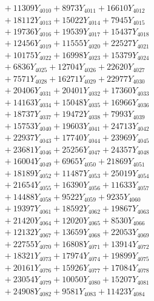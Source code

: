 \documentclass[a4paper,10pt]{article}
\begin{document}
{\begin{align}
&\;  + 11309 Y_{4010} + 8973 Y_{4011} + 16610 Y_{4012} \\[0.3ex]
&\;  + 18112 Y_{4013} + 15022 Y_{4014} + 7945 Y_{4015} \\[0.3ex]
&\;  + 19736 Y_{4016} + 19539 Y_{4017} + 15437 Y_{4018} \\[0.5ex]\allowbreak
&\;  + 12456 Y_{4019} + 11555 Y_{4020} + 22527 Y_{4021} \\[0.3ex]
&\;  + 10175 Y_{4022} + 16998 Y_{4023} + 15379 Y_{4024} \\[0.3ex]
&\;  + 6836 Y_{4025} + 12704 Y_{4026} + 22620 Y_{4027} \\[0.3ex]
&\;  + 7571 Y_{4028} + 16271 Y_{4029} + 22977 Y_{4030} \\[0.3ex]
&\;  + 20406 Y_{4031} + 20401 Y_{4032} + 17360 Y_{4033} \\[0.3ex]
&\;  + 14163 Y_{4034} + 15048 Y_{4035} + 16966 Y_{4036} \\[0.3ex]
&\;  + 18737 Y_{4037} + 19472 Y_{4038} + 7993 Y_{4039} \\[0.3ex]
&\;  + 15753 Y_{4040} + 19603 Y_{4041} + 24713 Y_{4042} \\[0.3ex]
&\;  + 22937 Y_{4043} + 17740 Y_{4044} + 23969 Y_{4045} \\[0.3ex]
&\;  + 23681 Y_{4046} + 25256 Y_{4047} + 24357 Y_{4048} \\[0.5ex]\allowbreak
&\;  + 16004 Y_{4049} + 6965 Y_{4050} + 21869 Y_{4051} \\[0.3ex]
&\;  + 18189 Y_{4052} + 11487 Y_{4053} + 25019 Y_{4054} \\[0.3ex]
&\;  + 21654 Y_{4055} + 16390 Y_{4056} + 11633 Y_{4057} \\[0.3ex]
&\;  + 14488 Y_{4058} + 9522 Y_{4059} + 9235 Y_{4060} \\[0.3ex]
&\;  + 19397 Y_{4061} + 18592 Y_{4062} + 19867 Y_{4063} \\[0.3ex]
&\;  + 21420 Y_{4064} + 12020 Y_{4065} + 8530 Y_{4066} \\[0.3ex]
&\;  + 12132 Y_{4067} + 13659 Y_{4068} + 22053 Y_{4069} \\[0.3ex]
&\;  + 22755 Y_{4070} + 16808 Y_{4071} + 13914 Y_{4072} \\[0.3ex]
&\;  + 18321 Y_{4073} + 17974 Y_{4074} + 19899 Y_{4075} \\[0.3ex]
&\;  + 20161 Y_{4076} + 15926 Y_{4077} + 17084 Y_{4078} \\[0.5ex]\allowbreak
&\;  + 23054 Y_{4079} + 10050 Y_{4080} + 15207 Y_{4081} \\[0.3ex]
&\;  + 24908 Y_{4082} + 9581 Y_{4083} + 11423 Y_{4084} \\[0.3ex]

\end{align}}
\end{document}
